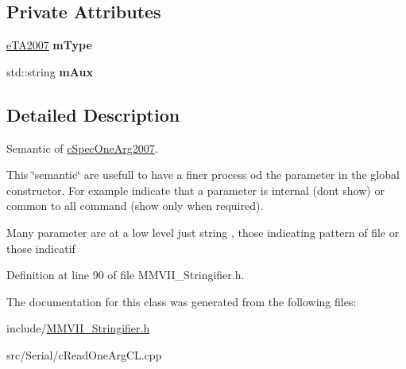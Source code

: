 \subsection*{Private Attributes}
\begin{DoxyCompactItemize}
\item 
\hyperlink{MMVII__enums_8h_a9d431a971072a6c440012f6325f616ad}{e\+T\+A2007} {\bfseries m\+Type}\hypertarget{classMMVII_1_1cSemA2007_ac088dab615a8c1daa006d75756b354f8}{}\label{classMMVII_1_1cSemA2007_ac088dab615a8c1daa006d75756b354f8}

\item 
std\+::string {\bfseries m\+Aux}\hypertarget{classMMVII_1_1cSemA2007_a3b3dd4fd378e1edc66c99ce90bfecfa1}{}\label{classMMVII_1_1cSemA2007_a3b3dd4fd378e1edc66c99ce90bfecfa1}

\end{DoxyCompactItemize}


\subsection{Detailed Description}
Semantic of \hyperlink{classMMVII_1_1cSpecOneArg2007}{c\+Spec\+One\+Arg2007}. 

This \char`\"{}semantic\char`\"{} are usefull to have a finer process od the parameter in the global constructor. For example indicate that a parameter is internal (dont show) or common to all command (show only when required).

Many parameter are at a low level just string , those indicating pattern of file or those indicatif 

Definition at line 90 of file M\+M\+V\+I\+I\+\_\+\+Stringifier.\+h.



The documentation for this class was generated from the following files\+:\begin{DoxyCompactItemize}
\item 
include/\hyperlink{MMVII__Stringifier_8h}{M\+M\+V\+I\+I\+\_\+\+Stringifier.\+h}\item 
src/\+Serial/c\+Read\+One\+Arg\+C\+L.\+cpp\end{DoxyCompactItemize}
